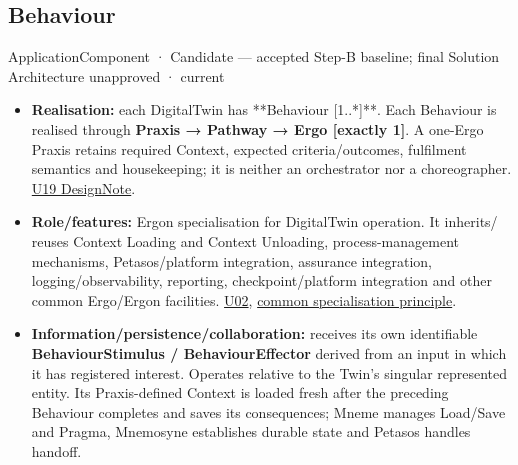 \subsection{Behaviour}

\label{element:a26f06d66bec4981b266e202c46a9afb}
{\small ApplicationComponent · Candidate — accepted Step-B baseline; final Solution Architecture unapproved · current}\par

\begin{itemize}


\item \textbf{Realisation:} each DigitalTwin has **Behaviour [1..*]**. Each Behaviour is
  realised through \textbf{Praxis → Pathway → Ergo [exactly 1]}. A one-Ergo Praxis
  retains required Context, expected criteria/outcomes, fulfilment semantics and
  housekeeping; it is neither an orchestrator nor a choreographer.
  \href{\detokenize{../../../../../docs/markdown/05-information-systems-architecture/design-notes/DesignNote-Digital-Twin-Behaviour-and-Execution-Semantics.md}}{U19 DesignNote}.

\item \textbf{Role/features:} Ergon specialisation for DigitalTwin operation. It inherits/
  reuses Context Loading and Context Unloading, process-management mechanisms,
  Petasos/platform integration, assurance integration, logging/observability,
  reporting, checkpoint/platform integration and other common Ergo/Ergon facilities.
  \href{\detokenize{../../../../../docs/markdown/05-information-systems-architecture/sources.md#u02}}{U02}, \href{\detokenize{../../../../../docs/markdown/05-information-systems-architecture/README.md#specialisation-principle}}{common specialisation principle}.

\item \textbf{Information/persistence/collaboration:} receives its own identifiable
  \textbf{BehaviourStimulus / BehaviourEffector} derived from an input in which it has
  registered interest. Operates relative to the Twin's singular represented
  entity. Its Praxis-defined Context is loaded fresh after the preceding
  Behaviour completes and saves its consequences; Mneme manages Load/Save and
  Pragma, Mnemosyne establishes durable state and Petasos handles handoff.


\end{itemize}
